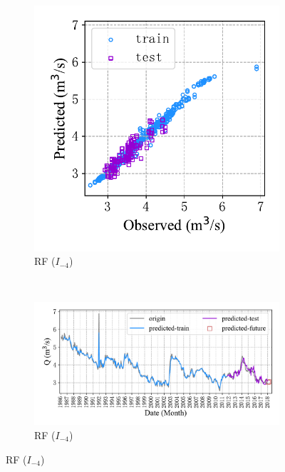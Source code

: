 \begin{figure}[!htbp]
\begin{subfigure}[b]{0.615\textwidth}
  \end{subfigure}
  \\
  \begin{subfigure}[b]{0.305\textwidth}
    \includegraphics[width=\textwidth]{Img/chap4_spr/out2/spr_scatter_in_4_out_2_rf.pdf}
    \vspace{-1.2cm}
    \caption{RF ($I_{-4}$)}
    \label{fig:spr_scatter_in_4_out_2_rf}
  \end{subfigure}
  ~
  \begin{subfigure}[b]{0.615\textwidth}
    \includegraphics[width=\textwidth]{Img/chap4_spr/out2/spr_series_in_4_out_2_rf.pdf}
    \vspace{-1.2cm}
    \caption{RF ($I_{-4}$)}
    \label{fig:spr_series_in_4_out_2_rf}
  \end{subfigure}
  \label{fig:spr_out_2}
\end{figure}

